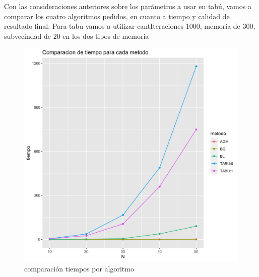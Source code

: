\documentclass[10pt,a4paper]{article}
\begin{document}
Con las consideraciones anteriores sobre los parámetros a usar en tabú, vamos a comparar los cuatro algoritmos pedidos, en cuanto a tiempo y calidad de resultado final. Para tabu vamos a utilizar cantIteraciones 1000, memoria de 300, subvecindad de $20$ en los dos tipos de memoria
\\
\begin{figure} [H]
    \centering
    \includegraphics[scale=0.15]{img/tiempos.png}
    \caption{comparación tiempos por algoritmo}
    \label{fig:tiempos}
\end{figure}
\end{document}
